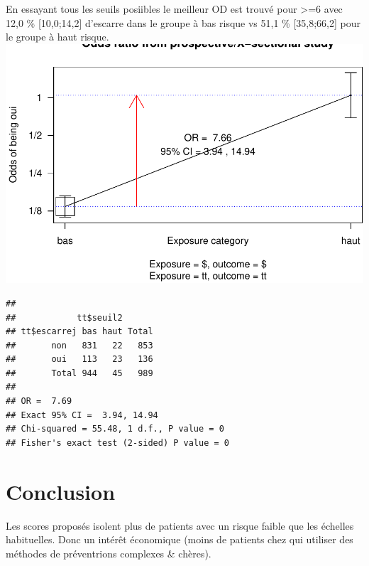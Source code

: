 \documentclass[]{article}
\begin{document}
En essayant tous les seuils posiibles le meilleur OD est trouvé pour
\textgreater{}=6 avec 12,0 \% {[}10,0;14,2{]} d'escarre dans le groupe à
bas risque vs 51,1 \% {[}35,8;66,2{]} pour le groupe à haut risque.
\includegraphics{book_escarre_files/figure-latex/seuil2-1.pdf}

\begin{verbatim}
## 
##            tt$seuil2
## tt$escarrej bas haut Total
##       non   831   22   853
##       oui   113   23   136
##       Total 944   45   989
## 
## OR =  7.69 
## Exact 95% CI =  3.94, 14.94  
## Chi-squared = 55.48, 1 d.f., P value = 0
## Fisher's exact test (2-sided) P value = 0
\end{verbatim}

\hypertarget{conclusion}{%
\section{Conclusion}\label{conclusion}}

Les scores proposés isolent plus de patients avec un risque faible que
les échelles habituelles. Donc un intérêt économique (moins de patients
chez qui utiliser des méthodes de préventrions complexes \& chères).
\end{document}
